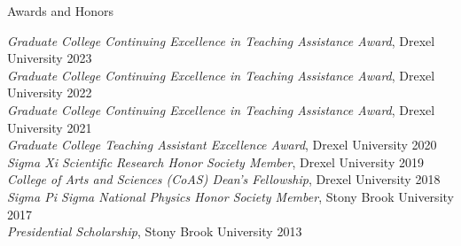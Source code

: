 \documentclass{resume} %
\begin{document}


\begin{rSection}{Awards and Honors}

 \textit{Graduate College Continuing Excellence in Teaching Assistance Award}, Drexel University \hfill{2023} \\
\textit{Graduate College Continuing Excellence in Teaching Assistance Award}, Drexel University \hfill{2022} \\
\textit{Graduate College Continuing Excellence in Teaching Assistance Award}, Drexel University \hfill{2021} \\
\textit{Graduate College Teaching Assistant Excellence Award}, Drexel University \hfill{2020} \\
\textit{Sigma Xi Scientific Research Honor Society Member}, Drexel University \hfill{2019}\\
\textit{College of Arts and Sciences (CoAS) Dean's Fellowship}, Drexel University \hfill {2018}\\
\textit{Sigma Pi Sigma National Physics Honor Society Member}, Stony Brook University \hfill{2017}\\
\textit{Presidential Scholarship}, Stony Brook University \hfill {2013}

\end{rSection}

\end{document}
